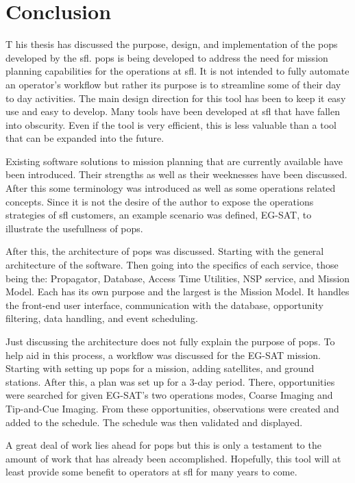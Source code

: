 \glsresetall{} 

\chapter{Conclusion}\label{chap:conclusion}

\lettrine[lines=2, findent=0pt, nindent=5pt]{T}{} his thesis has discussed
the purpose, design, and implementation of the \gls{pops} developed by the
\gls{sfl}. \gls{pops} is being developed to address the need for mission
planning capabilities for the operations at \gls{sfl}. It is not intended to
fully automate an operator's workflow but rather its purpose is to streamline
some of their day to day activities. The main design direction for this tool
has been to keep it easy use and easy to develop. Many tools have been
developed at \gls{sfl} that have fallen into obscurity. Even if the tool is
very efficient, this is less valuable than a tool that can be expanded into the
future. 

Existing software solutions to mission planning that are currently available
have been introduced. Their strengths as well as their weeknesses have been
discussed. After this some terminology was introduced as well as some
operations related concepts. Since it is not the desire of the author to expose
the operations strategies of \gls{sfl} customers, an example scenario was
defined, EG-SAT, to illustrate the usefullness of \gls{pops}.

After this, the architecture of \gls{pops} was discussed. Starting with the
general architecture of the software. Then going into the specifics of each
service, those being the: Propagator, Database, Access Time Utilities, NSP
service, and Mission Model. Each has its own purpose and the largest is the
Mission Model. It handles the front-end user interface, communication with the
database, opportunity filtering, data handling, and event scheduling.

Just discussing the architecture does not fully explain the purpose of
\gls{pops}. To help aid in this process, a workflow was discussed for the
EG-SAT mission. Starting with setting up \gls{pops} for a mission, adding
satellites, and ground stations. After this, a plan was set up for a 3-day
period. There, opportunities were searched for given EG-SAT's two operations
modes, Coarse Imaging and Tip-and-Cue Imaging. From these opportunities,
observations were created and added to the schedule. The schedule was then
validated and displayed.  

A great deal of work lies ahead for \gls{pops} but this is only a testament to
the amount of work that has already been accomplished. Hopefully, this tool
will at least provide some benefit to operators at \gls{sfl} for many years to
come.










